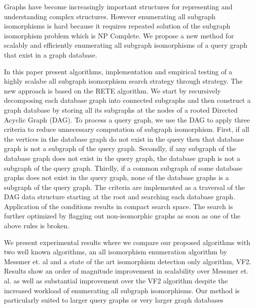 
Graphs have become increasingly important structures for representing and understanding complex structures. However enumerating all subgraph isomorphisms is hard because it requires repeated solution of the subgraph isomorphism problem which is NP Complete.
We propose a new method for scalably and efficiently 
enumerating all subgraph isomorphisms of a query graph that exist in a graph database. 

In this paper present algorithms, implementation and empirical testing of a highly scalabe all subgraph isomorphism search strategy through strategy. The new approach is based on the RETE algorithm. We start by recursively decomposing each database graph into connected subgraphs and then construct a graph database by storing all its subgraphs at the nodes of a rooted Directed Acyclic Graph (DAG). To process a query graph, we use the DAG to apply three criteria to reduce unnecessary computation of subgraph isomorphism. First, if all the vertices in the database graph do not exist in the query then that database graph is not a subgraph of the query graph. Secondly, if any subgraph of the database graph does not exist in the query graph, the database graph is not a subgraph of the query graph. Thirdly, if a common subgraph of some database graphs does not exist in the query graph, none of the database graphs is a subgraph of the query graph. The criteria are implemented as a traversal of the DAG data structure starting at the root and searching each database graph. Application of the conditions results in compact search space. The search is further optimized by flagging out non-isomorphic graphs as soon as one of the above rules is broken. 

We present experimental results where we compare our proposed algorithms with two well known algorithms, an all isomorphism enumeration algorithm by Messmer et. al and a state of the art isomorphism detection only algorithm, VF2. Results show an order of magnitude improvement in scalability over Messmer et. al. as well as substantial improvement over the VF2 algorithm despite the increased workload of enumerating all subgraph isomorphisms. Our method is particularly suited to larger query graphs or very larger graph databases
